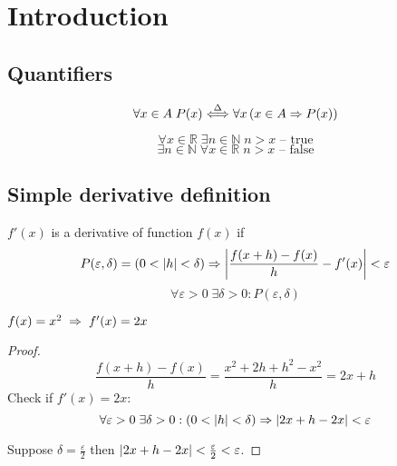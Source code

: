 \section{Introduction}

\subsection{Quantifiers}

\begin{equation}
    \forall x \in A \;   P(x) \stackrel{\Delta}{\Longleftrightarrow} \forall x \left( x \in A \Rightarrow P(x) \right)
\end{equation}

\begin{example}
    \[ \forall x \in \mathbb{R} \; \exists n \in \mathbb{N} \; n > x \text{ -- true} \]
    \[ \exists n \in \mathbb{N} \; \forall x \in \mathbb{R} \; n > x \text{ -- false} \]
\end{example}

\subsection{Simple derivative definition}
\begin{definition}
$f'(x)$ is a derivative of function $f(x)$ if
\[ P(\varepsilon, \delta) = (0 < \left\lvert h \right\rvert < \delta) \Rightarrow \left\lvert \frac{f(x + h) - f(x)}{h} - f'(x) \right\rvert < \varepsilon \]
\[ \forall \varepsilon > 0 \; \exists \delta > 0: P(\varepsilon, \delta) \]
\end{definition}

\begin{example} $ f(x) = x^2 \;\Rightarrow\; f'(x) = 2x $ \end{example}

\begin{proof}
    \[ \frac{f(x + h) - f(x)}{h} = \frac{x ^ 2 + 2h + h^2 - x^2}{h} = 2x + h \]
    Check if $f'(x) = 2x$:
    \[ \forall \varepsilon > 0 \; \exists \delta > 0: (0 < \left\lvert h \right\rvert < \delta) \Rightarrow \left\lvert 2x + h - 2x \right\rvert < \varepsilon \]

    Suppose $\delta = \frac{\varepsilon}{2}$ then $\left\lvert 2x + h - 2x \right\rvert < \frac{\varepsilon}{2} < \varepsilon$.
\end{proof}

